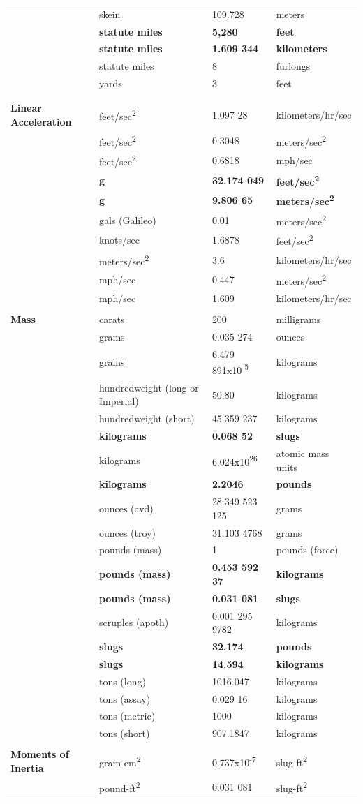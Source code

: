 \documentclass[
]{book}
\begin{document}
\begin{longtable}[]{@{}llll@{}}
& skein & 109.728 & meters\tabularnewline
& \textbf{statute miles} & \textbf{5,280} & \textbf{feet}\tabularnewline
& \textbf{statute miles} & \textbf{1.609 344} & \textbf{kilometers}\tabularnewline
& statute miles & 8 & furlongs\tabularnewline
& yards & 3 & feet\tabularnewline
& & &\tabularnewline
& & &\tabularnewline
\textbf{Linear Acceleration} & feet/sec\textsuperscript{2} & 1.097 28 & kilometers/hr/sec\tabularnewline
& feet/sec\textsuperscript{2} & 0.3048 & meters/sec\textsuperscript{2}\tabularnewline
& feet/sec\textsuperscript{2} & 0.6818 & mph/sec\tabularnewline
& \textbf{g} & \textbf{32.174 049} & \textbf{feet/sec\textsuperscript{2}}\tabularnewline
& \textbf{g} & \textbf{9.806 65} & \textbf{meters/sec\textsuperscript{2}}\tabularnewline
& gals (Galileo) & 0.01 & meters/sec\textsuperscript{2}\tabularnewline
& knots/sec & 1.6878 & feet/sec\textsuperscript{2}\tabularnewline
& meters/sec\textsuperscript{2} & 3.6 & kilometers/hr/sec\tabularnewline
& mph/sec & 0.447 & meters/sec\textsuperscript{2}\tabularnewline
& mph/sec & 1.609 & kilometers/hr/sec\tabularnewline
& & &\tabularnewline
\textbf{Mass} & carats & 200 & milligrams\tabularnewline
& grams & 0.035 274 & ounces\tabularnewline
& grains & 6.479 891x10\textsuperscript{-5} & kilograms\tabularnewline
& hundredweight (long or Imperial) & 50.80 & kilograms\tabularnewline
& hundredweight (short) & 45.359 237 & kilograms\tabularnewline
& \textbf{kilograms} & \textbf{0.068 52} & \textbf{slugs}\tabularnewline
& kilograms & 6.024x10\textsuperscript{26} & atomic mass units\tabularnewline
& \textbf{kilograms} & \textbf{2.2046} & \textbf{pounds}\tabularnewline
& ounces (avd) & 28.349 523 125 & grams\tabularnewline
& ounces (troy) & 31.103 4768 & grams\tabularnewline
& pounds (mass) & 1 & pounds (force)\tabularnewline
& \textbf{pounds (mass)} & \textbf{0.453 592 37} & \textbf{kilograms}\tabularnewline
& \textbf{pounds (mass)} & \textbf{0.031 081} & \textbf{slugs}\tabularnewline
& scruples (apoth) & 0.001 295 9782 & kilograms\tabularnewline
& \textbf{slugs} & \textbf{32.174} & \textbf{pounds}\tabularnewline
& \textbf{slugs} & \textbf{14.594} & \textbf{kilograms}\tabularnewline
& tons (long) & 1016.047 & kilograms\tabularnewline
& tons (assay) & 0.029 16 & kilograms\tabularnewline
& tons (metric) & 1000 & kilograms\tabularnewline
& tons (short) & 907.1847 & kilograms\tabularnewline
& & &\tabularnewline
\textbf{Moments of Inertia} & gram-cm\textsuperscript{2} & 0.737x10\textsuperscript{-7} & slug-ft\textsuperscript{2}\tabularnewline
& pound-ft\textsuperscript{2} & 0.031 081 & slug-ft\textsuperscript{2}\tabularnewline

\end{longtable}
\end{document}
